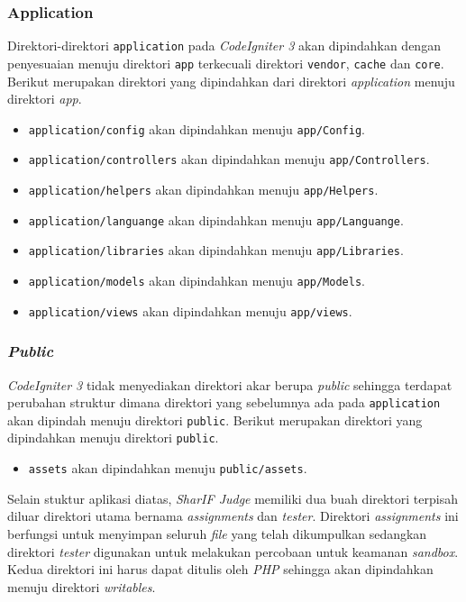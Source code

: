 \subsubsection{Application}
Direktori-direktori \texttt{application} pada \textit{CodeIgniter 3} akan dipindahkan dengan penyesuaian menuju direktori \texttt{app} terkecuali direktori \texttt{vendor}, \texttt{cache} dan \texttt{core}. Berikut merupakan direktori yang dipindahkan dari direktori \textit{application} menuju direktori \textit{app}.
\begin{itemize}
\item \verb|application/config| akan dipindahkan menuju \texttt{app/Config}.
\item \verb|application/controllers| akan dipindahkan menuju \texttt{app/Controllers}.
\item \verb|application/helpers| akan dipindahkan menuju \texttt{app/Helpers}.
\item \verb|application/languange| akan dipindahkan menuju \texttt{app/Languange}.
\item \verb|application/libraries| akan dipindahkan menuju \texttt{app/Libraries}.
\item \verb|application/models| akan dipindahkan menuju \texttt{app/Models}.
\item \verb|application/views| akan dipindahkan menuju \texttt{app/views}.
\end{itemize}

\subsubsection{\textit{Public}}
\textit{CodeIgniter 3} tidak menyediakan direktori akar berupa \textit{public} sehingga terdapat perubahan struktur dimana direktori yang sebelumnya ada pada \texttt{application} akan dipindah menuju direktori \texttt{public}. Berikut merupakan direktori yang dipindahkan menuju direktori \texttt{public}.
\begin{itemize}
\item \verb|assets| akan dipindahkan menuju \texttt{public/assets}.
\end{itemize}

Selain stuktur aplikasi diatas, \textit{SharIF Judge} memiliki dua buah direktori terpisah diluar direktori utama bernama \textit{assignments} dan \textit{tester}. Direktori \textit{assignments} ini berfungsi untuk menyimpan seluruh \textit{file} yang telah dikumpulkan sedangkan direktori \textit{tester} digunakan untuk melakukan percobaan untuk keamanan \textit{sandbox}. Kedua direktori ini harus dapat ditulis oleh \textit{PHP} sehingga akan dipindahkan menuju direktori \textit{writables}.


